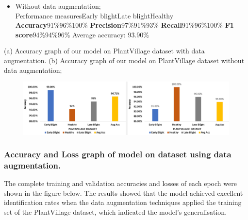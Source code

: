 \documentclass[11pt]{report}
\begin{document}
\begin{itemize}
	\item Without data augmentation;\\
	Performance measures\hspace{3cm}Early blight\hspace{2cm}Late blight\hspace{2cm}Healthy\\
	\textbf{Accuracy}\hspace{6cm}91\%\hspace{3cm}96\%\hspace{3cm}100\%
	\textbf{Precision}\hspace{6cm}97\%\hspace{3.5cm}91\%\hspace{3cm}93\%
	\textbf{Recall}\hspace{6.5cm}91\%\hspace{3.5cm}96\%\hspace{3cm}100\%
	\textbf{F1 score}\hspace{6cm}94\%\hspace{3.5cm}94\%\hspace{3cm}96\%
	Average accuracy: 93.90\%
	
\end{itemize}

(a) Accuracy graph of our model on PlantVillage dataset with data augmentation. (b) Accuracy graph of our model on PlantVillage dataset without data augmentation;\\

\begin{figure}[h]
	\centerline{\small 
		\includegraphics[height=0.17\textheight]  {v1}}
\end{figure}

\subsubsection*{Accuracy and Loss graph of model on dataset using data augmentation.}
The complete training and validation accuracies and losses of each epoch
were shown in the figure below. The results showed that the model achieved excellent
identification rates when the data augmentation techniques applied the training set of the
PlantVillage dataset, which indicated the model’s generalisation.\\
\end{document}
